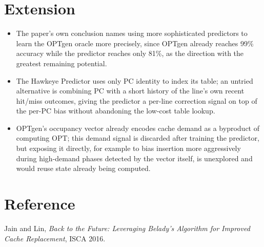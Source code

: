 \documentclass[10pt, conference]{IEEEtran}
\begin{document}
\section{Extension}
\begin{itemize}[leftmargin=*, itemsep=2pt, topsep=2pt, parsep=1pt]
    \item The paper's own conclusion names using more sophisticated predictors to learn the OPTgen oracle more precisely, since OPTgen already reaches 99\% accuracy while the predictor reaches only 81\%, as the direction with the greatest remaining potential.
    \item The Hawkeye Predictor uses only PC identity to index its table; an untried alternative is combining PC with a short history of the line's own recent hit/miss outcomes, giving the predictor a per-line correction signal on top of the per-PC bias without abandoning the low-cost table lookup.
    \item OPTgen's occupancy vector already encodes cache demand as a byproduct of computing OPT; this demand signal is discarded after training the predictor, but exposing it directly, for example to bias insertion more aggressively during high-demand phases detected by the vector itself, is unexplored and would reuse state already being computed.
\end{itemize}

\section{Reference}
Jain and Lin, \emph{Back to the Future: Leveraging Belady's Algorithm for Improved Cache Replacement}, ISCA 2016.
\end{document}

